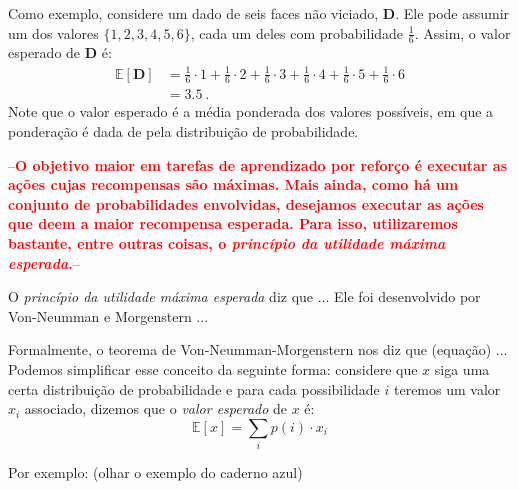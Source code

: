 \documentclass{article}
\newcommand*{\RandomVariable}[1]{\mathbf{#1}}
\newcommand*{\ExpectedValue}{\mathbb{E}}
\newcommand{\todo}[1]{ --\textcolor{red}{\textbf{#1}}--}
\begin{document}
        Como exemplo, considere um dado de seis faces não viciado, $\RandomVariable{D}$. Ele pode assumir um dos valores $\{1, 2, 3, 4, 5, 6\}$, cada um deles com probabilidade $\frac{1}{6}$. Assim, o valor esperado de $\RandomVariable{D}$ é:
        \begin{equation*}
        \begin{aligned}
            \ExpectedValue[\RandomVariable{D}] & = \frac{1}{6} \cdot 1 + \frac{1}{6} \cdot 2 + \frac{1}{6} \cdot 3 + \frac{1}{6} \cdot 4 + \frac{1}{6} \cdot 5 + \frac{1}{6} \cdot 6 \\
            & = 3.5\ .
        \end{aligned}
        \end{equation*}        
        Note que o valor esperado é a média ponderada dos valores possíveis, em que a ponderação é dada de pela distribuição de probabilidade.
    
        \todo{O objetivo maior em tarefas de aprendizado por reforço é executar as ações cujas recompensas são máximas. Mais ainda, como há um conjunto de probabilidades envolvidas, desejamos executar as ações que deem a maior recompensa esperada. Para isso, utilizaremos bastante, entre outras coisas, o \emph{princípio da utilidade máxima esperada}.}

        O \emph{princípio da utilidade máxima esperada} diz que ... Ele foi desenvolvido por Von-Neumman e Morgenstern ...
        
        Formalmente, o teorema de Von-Neumman-Morgenstern nos diz que (equação) ... Podemos simplificar esse conceito da seguinte forma: considere que $x$ siga uma certa distribuição de probabilidade e para cada possibilidade $i$ teremos um valor $x_i$ associado, dizemos que o \emph{valor esperado} de $x$ é:
        \begin{equation}
            \mathbb{E} \left [ x \right ] = \sum_{i} p(i) \cdot x_i
        \end{equation}
        
        Por exemplo: (olhar o exemplo do caderno azul)
    
\end{document}
